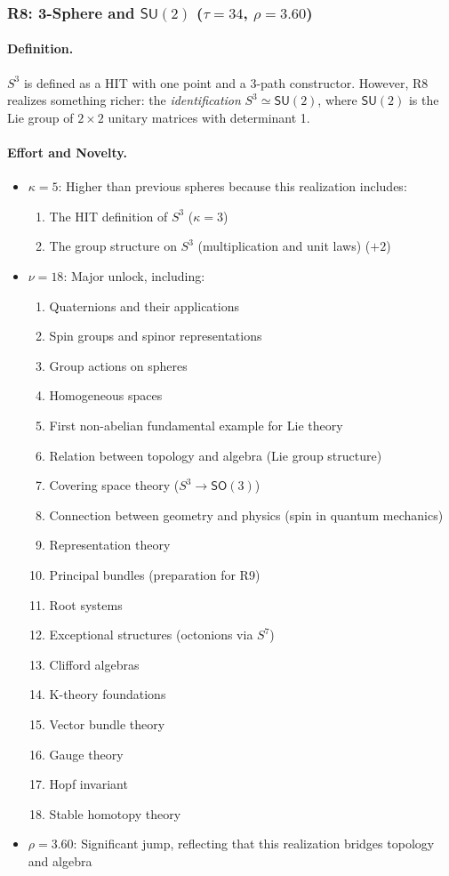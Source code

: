 \documentclass[11pt]{article}
\theoremstyle{definition}
\begin{document}
\subsubsection{R8: 3-Sphere and $\mathsf{SU}(2)$ ($\tau=34$, $\rho=3.60$)}

\paragraph{Definition.}
$S^3$ is defined as a HIT with one point and a 3-path constructor. However, R8 realizes something richer: the \emph{identification} $S^3 \simeq \mathsf{SU}(2)$, where $\mathsf{SU}(2)$ is the Lie group of $2 \times 2$ unitary matrices with determinant 1.

\paragraph{Effort and Novelty.}
\begin{itemize}
\item $\kappa = 5$: Higher than previous spheres because this realization includes:
\begin{enumerate}
\item The HIT definition of $S^3$ ($\kappa=3$)
\item The group structure on $S^3$ (multiplication and unit laws) ($+2$)
\end{enumerate}
\item $\nu = 18$: Major unlock, including:
\begin{enumerate}
\item Quaternions and their applications
\item Spin groups and spinor representations
\item Group actions on spheres
\item Homogeneous spaces
\item First non-abelian fundamental example for Lie theory
\item Relation between topology and algebra (Lie group structure)
\item Covering space theory ($S^3 \to \mathsf{SO}(3)$)
\item Connection between geometry and physics (spin in quantum mechanics)
\item Representation theory
\item Principal bundles (preparation for R9)
\item Root systems
\item Exceptional structures (octonions via $S^7$)
\item Clifford algebras
\item K-theory foundations
\item Vector bundle theory
\item Gauge theory
\item Hopf invariant
\item Stable homotopy theory
\end{enumerate}
\item $\rho = 3.60$: Significant jump, reflecting that this realization bridges topology and algebra
\end{itemize}
\end{document}
